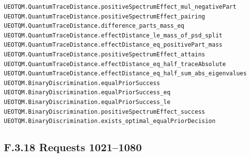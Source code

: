 \documentclass[
  11pt,
  oneside]{book}
\begin{document}
\begin{Verbatim}[breaklines,breakanywhere,fontsize=\scriptsize]
UEOTQM.QuantumTraceDistance.positiveSpectrumEffect_mul_negativePart
UEOTQM.QuantumTraceDistance.positiveSpectrumEffect_pairing
UEOTQM.QuantumTraceDistance.difference_parts_mass_eq
UEOTQM.QuantumTraceDistance.effectDistance_le_mass_of_psd_split
UEOTQM.QuantumTraceDistance.effectDistance_eq_positivePart_mass
UEOTQM.QuantumTraceDistance.positiveSpectrumEffect_attains
UEOTQM.QuantumTraceDistance.effectDistance_eq_half_traceAbsolute
UEOTQM.QuantumTraceDistance.effectDistance_eq_half_sum_abs_eigenvalues
UEOTQM.BinaryDiscrimination.equalPriorSuccess
UEOTQM.BinaryDiscrimination.equalPriorSuccess_eq
UEOTQM.BinaryDiscrimination.equalPriorSuccess_le
UEOTQM.BinaryDiscrimination.positiveSpectrumEffect_success
UEOTQM.BinaryDiscrimination.exists_optimal_equalPriorDecision
\end{Verbatim}

\subsection{F.3.18 Requests 1021--1080}
\end{document}

